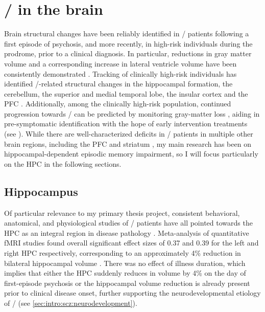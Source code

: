 \section{\Scz/ in the brain}
\label{sec:intro:scz:brain}
Brain structural changes have been reliably identified in \scz/ patients following a first episode of psychosis, and more recently, in high-risk individuals during the prodrome, prior to a clinical diagnosis.
In particular, reductions in gray matter volume and a corresponding increase in lateral ventricle volume have been consistently demonstrated \citep{Fusar-Poli2013, Shepherd2012}.
Tracking of clinically high-risk individuals has identified \scz/-related structural changes in the hippocampal formation, the cerebellum, the superior and medial temporal lobe, the insular cortex and the \ac{PFC} \citep{Cannon2015, Millan2016}.
Additionally, among the clinically high-risk population, continued progression towards \scz/ can be predicted by monitoring gray-matter loss \citep{Tognin2014}, aiding in pre-symptomatic identification with the hope of early intervention treatments (see ).
While there are well-characterized deficits in \scz/ patients in multiple other brain regions, including the \ac{PFC} \citep{Weinberger1986} and striatum \citep{Simpson2010}, my main research has been on hippocampal-dependent episodic memory impairment, so I will focus particularly on the \ac{HPC} in the following sections.

\subsection{Hippocampus}
\label{sec:intro:scz:hpc}
Of particular relevance to my primary thesis project, consistent behavioral, anatomical, and physiological studies of \scz/ patients have all pointed towards the HPC as an integral region in disease pathology \citep{Boyer2007, Bogerts1985, Jakob1986}.
Meta-analysis of quantitative \ac{fMRI} studies found overall significant effect sizes of 0.37 and 0.39 for the left and right \ac{HPC} respectively, corresponding to an approximately 4\% reduction in bilateral hippocampal volume \citep{Nelson1998}.
There was no effect of illness duration, which implies that either the \ac{HPC} suddenly reduces in volume by 4\% on the day of first-episode psychosis or the hippocampal volume reduction is already present prior to clinical disease onset, further supporting the neurodevelopmental etiology of \scz/ (see \autoref{sec:intro:scz:neurodevelopment}). 

